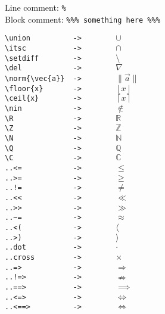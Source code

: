 \documentclass[12pt]{article}
\newcommand{\norm}[1]{\|#1\|}
\newcommand{\floor}[1]{\left\lfloor #1 \right\rfloor}
\newcommand{\ceil}[1]{\left\lceil #1 \right\rceil}
\begin{document}
\begin{flushleft}
Line comment: \verb|%|\\
Block comment: \verb|%|\verb|%|\verb|%|\verb| something here |\verb|%|\verb|%|\verb|%|

\medskip

\verb|\union          ->        |$\cup$\\
\verb|\itsc           ->        |$\cap$\\
\verb|\setdiff        ->        |$\setminus$\\
\verb|\del            ->        |$\nabla$\\
\verb|\norm{\vec{a}}  ->        |$\norm{\vec{a}}$\\
\verb|\floor{x}       ->        |$\floor{x}$\\
\verb|\ceil{x}        ->        |$\ceil{x}$\\
\verb|\nin            ->        |$\notin$\\
\verb|\R              ->        |$\mathbb{R}$\\
\verb|\Z              ->        |$\mathbb{Z}$\\
\verb|\N              ->        |$\mathbb{N}$\\
\verb|\Q              ->        |$\mathbb{Q}$\\
\verb|\C              ->        |$\mathbb{C}$\\
\verb|..<=            ->        |$\leq$\\
\verb|..>=            ->        |$\geq$\\
\verb|..!=            ->        |$\neq$\\
\verb|..<<            ->        |$\ll$\\
\verb|..>>            ->        |$\gg$\\
\verb|..~=            ->        |$\approx$\\
\verb|..<(            ->        |$\langle$\\
\verb|..>)            ->        |$\rangle$\\
\verb|..dot           ->        |$\cdot$\\
\verb|..cross         ->        |$\times$\\
\verb|..=>            ->        |$\Rightarrow$\\
\verb|..!=>           ->        |$\nRightarrow$\\
\verb|..==>           ->        |$\implies$\\
\verb|..<=>           ->        |$\Leftrightarrow$\\
\verb|..<==>          ->        |$\iff$\\

\end{flushleft}
\end{document}
